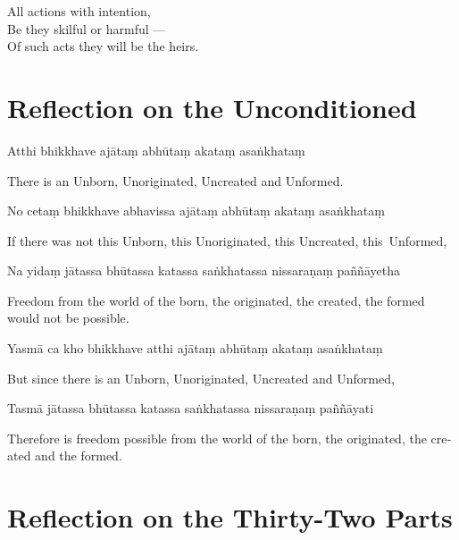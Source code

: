 All actions with intention,\\
Be they skilful or harmful ---\\
Of such acts they will be the heirs.


\section[The Unconditioned]{Reflection on the Unconditioned}

\begin{leader}
\end{leader}


Atthi bhikkhave ajātaṃ abhūtaṃ akataṃ asaṅkhataṃ

\begin{english}
  There is an Unborn, Unoriginated, Uncreated and Unformed.
\end{english}

No cetaṃ bhikkhave abhavissa ajātaṃ abhūtaṃ akataṃ asaṅkhataṃ

\begin{english}
  If there was not this Unborn, this Unoriginated, this Uncreated, this~Unformed,
\end{english}

Na yidaṃ jātassa bhūtassa katassa saṅkhatassa nissaraṇaṃ paññāyetha

\begin{english}
  Freedom from the world of the born, the originated, the created, the formed would not be possible.
\end{english}

Yasmā ca kho bhikkhave atthi ajātaṃ abhūtaṃ akataṃ asaṅkhataṃ

\begin{english}
  But since there is an Unborn, Unoriginated, Uncreated and Unformed,
\end{english}

Tasmā jātassa bhūtassa katassa saṅkhatassa nissaraṇaṃ paññāyati

\begin{english}
  Therefore is freedom possible from the world of the born, the originated, the created and the formed.
\end{english}


\section{Reflection on the Thirty-Two Parts}

